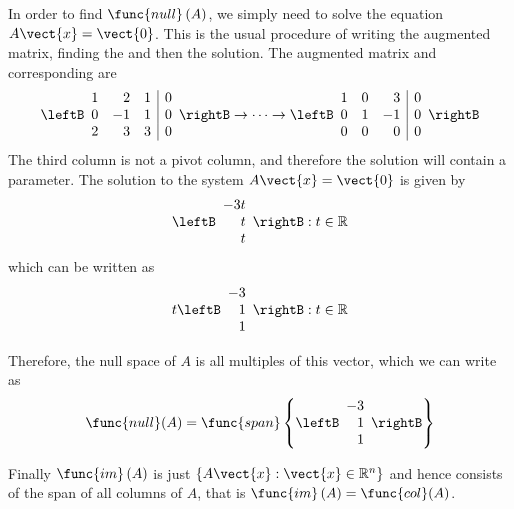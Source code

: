 \begin{solution}
In order to find $\func{null} \left( A\right) $, we simply need to solve the
equation $A\vect{x}=\vect{0}$. This is the usual procedure of writing
the augmented matrix, finding the \rref \;and then the solution. The
augmented matrix and corresponding \rref \;are
\begin{equation*}
\leftB 
\begin{array}{rrr|r}
1 & 2 & 1 & 0 \\ 
0 & -1 & 1 & 0 \\ 
2 & 3 & 3 & 0
\end{array}
\rightB
\rightarrow \cdots \rightarrow
\leftB 
\begin{array}{rrr|r}
1 & 0 & 3 & 0 \\ 
0 & 1 & -1 & 0 \\ 
0 & 0 & 0 & 0
\end{array}
\rightB
\end{equation*}
The third column is not a pivot column, and therefore the solution
will contain a parameter. The solution to the system
$A\vect{x}=\vect{0}$ is given by
\begin{equation*}
\leftB 
\begin{array}{r}
-3t \\ 
t \\ 
t
\end{array}
\rightB :t\in \mathbb{R}
\end{equation*}
which can be written as 
\begin{equation*}
t
\leftB 
\begin{array}{r}
-3 \\ 
1 \\ 
1
\end{array}
\rightB :t\in \mathbb{R}
\end{equation*}

Therefore, the null space of $A$ is all multiples of this vector, which we can write as
\begin{equation*}
\func{null} (A) = \func{span} \left\{ \leftB 
\begin{array}{r}
-3 \\ 
1 \\ 
1
\end{array}
\rightB
\right\}
\end{equation*}

Finally $\func{im}\left( A\right) $ is just $\left\{ A\vect{x} :
\vect{x} \in \mathbb{R}^n \right\}$ and hence consists of the span of
all columns of $A$, that is $\func{im}\left( A\right) = \func{col} (A)$. 


\end{solution}
